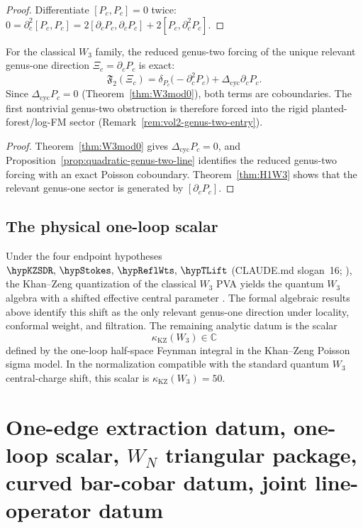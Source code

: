 \begin{proof}
Differentiate $[P_c,P_c]=0$ twice:
$0=\partial_c^2[P_c,P_c]=2[\partial_cP_c,\partial_cP_c]+2[P_c,\partial_c^2P_c]$.
\end{proof}

\begin{corollary}
\label{cor:w3-no-quadratic-self-obstruction}
For the classical $W_3$ family, the reduced genus-two forcing of the
unique relevant genus-one direction $\Xi_c=\partial_cP_c$ is exact:
\[
\mathfrak{F}_2(\Xi_c)
=
\delta_{P_c}\bigl(-\partial_c^2P_c\bigr)
+\Delta_{\mathrm{cyc}}\partial_cP_c.
\]
Since $\Delta_{\mathrm{cyc}}P_c=0$
\textup{(}Theorem~\textup{\ref{thm:W3mod0})}, both terms are
coboundaries. The first nontrivial genus-two obstruction is
therefore forced into the rigid planted-forest/log-FM sector
\textup{(}Remark~\textup{\ref{rem:vol2-genus-two-entry})}.
\end{corollary}

\begin{proof}
Theorem~\ref{thm:W3mod0} gives $\Delta_{\mathrm{cyc}}P_c=0$, and
Proposition~\ref{prop:quadratic-genus-two-line} identifies the reduced
genus-two forcing with an exact Poisson coboundary. Theorem~\ref{thm:H1W3}
shows that the relevant genus-one sector is generated by $[\partial_cP_c]$.
\end{proof}

\subsection{The physical one-loop scalar}

Under the four endpoint hypotheses
$\hypKZSDR,\,\hypStokes,\,\hypReflWts,\,\hypTLift$
\textup{(}CLAUDE.md slogan~\textup{16};
\cite{KZ25,Costello2011Renorm,CG17,LurieHA}\textup{)},
the Khan--Zeng quantization of the classical $W_3$ PVA yields the quantum
$W_3$ algebra with a shifted effective central parameter \cite{KZ25}.
The formal algebraic results above identify this shift as the only
relevant genus-one direction under locality, conformal weight, and
filtration. The remaining analytic datum is the scalar
\[
\kappa_{\mathrm{KZ}}(W_3)\in\mathbb C
\]
defined by the one-loop half-space Feynman integral in the
Khan--Zeng Poisson sigma model. In the normalization compatible with
the standard quantum $W_3$ central-charge shift, this scalar is
\(\kappa_{\mathrm{KZ}}(W_3)=50\).

\section{One-edge extraction datum, one-loop scalar, $W_N$ triangular package, curved bar-cobar datum, joint line-operator datum}

